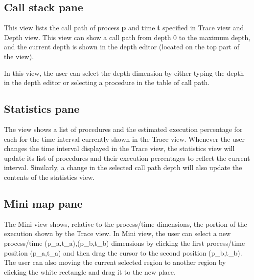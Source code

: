 \documentclass[english]{article}
\begin{document}
\subsection{Call stack pane}

This view lists the call path of process \textbf{p} and time \textbf{t} specified in Trace view and Depth view.
This view can show a call path from depth $0$ to the maximum depth, and the current depth is shown in the depth editor (located on the top part of the view).

In this view, the user can select the depth dimension by either typing the depth in the depth editor or selecting a procedure in the table of call path.


\subsection{Statistics pane}

The view shows a list of procedures and the estimated execution percentage for each for the time interval currently shown in the Trace view.
  Whenever the user changes the time interval displayed in the Trace view, the statistics view will update its list of procedures and their execution percentages to
  reflect the current interval.  Similarly, a change in the selected call path depth will also update the contents of the statistics view.


\subsection{Mini map pane}

The Mini view shows, relative to the process/time dimensions, the portion of the execution shown by the Trace view.
In Mini view, the user can select a new process/time (p_a,t_a),(p_b,t_b) dimensions by clicking the first process/time position (p_a,t_a) and then drag the cursor to the second position (p_b,t_b).
The user can also moving the current selected region to another region by clicking the white rectangle and drag it to the new place.
\end{document}
